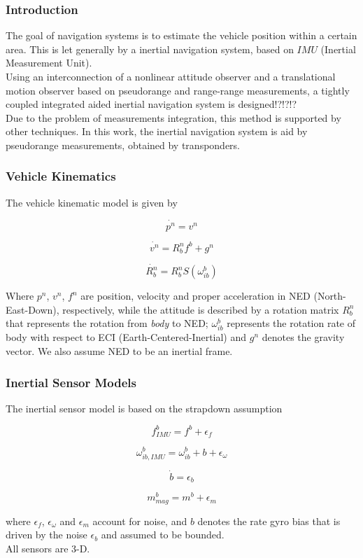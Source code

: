 \documentclass{beamer}
\begin{document}
	\begin{frame}
		\frametitle{Introduction}
	The goal of navigation systems is to estimate the vehicle position within a certain area. This is let generally by a inertial navigation system, based on $IMU$ (Inertial Measurement Unit).\\
	
	Using an interconnection of a nonlinear attitude observer and a translational motion observer based on pseudorange and range-range measurements, a tightly coupled integrated aided inertial navigation system is designed!?!?!?\\
	
	Due to the problem of measurements integration, this method is supported by other techniques. In this work, the inertial navigation system is aid by pseudorange measurements, obtained by transponders.
	\end{frame}


	\begin{frame}
	\frametitle{Vehicle Kinematics}
	The vehicle kinematic model is given by
	
	\[ \dot{p^n} = v^n \]
	
	\[ \dot{v^n} = R^n_b f^b + g^n\]
	
	\[ \dot{R^n_b} = R^n_bS(\omega^b_{ib}) \]
	
	Where $p^n$, $v^n$, $f^n$ are position, velocity and proper acceleration in NED (North-East-Down), respectively, while the attitude is described by a rotation matrix $R^n_b$ that represents the rotation from \textit{body} to NED; $\omega^b_{ib}$ represents the rotation rate of body with respect to ECI (Earth-Centered-Inertial) and $g^n$ denotes the gravity vector. We also assume NED to be an inertial frame. 
	
	\end{frame}
	
	\begin{frame}
	\frametitle{Inertial Sensor Models}
	The inertial sensor model is based on the strapdown assumption
	
	\[ f^b_{IMU} = f^b + \epsilon_f\]
	
	\[ \omega^b_{ib,IMU} = \omega^b_{ib} + b + \epsilon_\omega \]
	
	\[ \dot{b} = \epsilon_b \]
	
	\[ m^b_{mag} = m^b + \epsilon_m \]
	
	where $\epsilon_f$, $\epsilon_\omega$ and $\epsilon_m$ account for noise, and $b$ denotes the rate gyro bias that is driven by the noise $\epsilon_b$ and assumed to be bounded.  
	\\ All sensors are 3-D.
	\end{frame}
	
\end{document}
